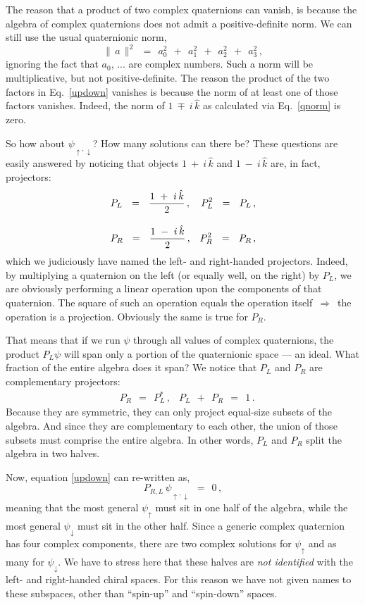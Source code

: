 \documentclass[epsfig,12pt]{article}
\newcommand{\kk}{\hat k}
\begin{document}
	The reason that a product of two complex quaternions can vanish, is because
	the algebra of complex quaternions does not admit a positive-definite norm.
	We can still use the usual quaternionic norm,
\begin{equation}
\label{qnorm}
	\|\,a\,\|^2	~~=~~	a_0^2  ~~+~~  a_1^2  ~~+~~  a_2^2  ~~+~~  a_3^2\,,
\end{equation}
	ignoring the fact that $ a_0 $, ... are complex numbers.
	Such a norm will be multiplicative, but not positive-definite.
	The reason the product of the two factors in Eq.~\eqref{updown} vanishes 
	is because the norm of at least one of those factors vanishes.
	Indeed, the norm of $ 1 ~\mp~ i\,\kk $ as calculated via Eq.~\eqref{qnorm} is zero.

	So how about $ \psi_{\uparrow,\downarrow} $? How many solutions can there be?
	These questions are easily answered by noticing that objects $ 1 ~+~ i\,\kk $ 
	and $ 1 ~-~ i\,\kk $ are, in fact, projectors:
\begin{align}
%
	\notag
	&
	P_L	~~=~~	\frac { 1 ~+~ i\,\kk } 2\,,
	&
	P_L^2	~~=~~	P_L\,,
	\\[3mm]
%	
	&
	P_R	~~=~~	\frac { 1 ~-~ i\,\kk } 2\,,
	&
	P_R^2	~~=~~	P_R\,,
\end{align}
	which we judiciously have named the left- and right-handed projectors.
	Indeed, by multiplying a quaternion on the left (or equally well, on the right) by $ P_L $,
	we are obviously performing a linear operation upon the components of that quaternion.
	The square of such an operation equals the operation itself $ \,\Rightarrow\, $
	the operation is a projection.
	Obviously the same is true for $ P_R $.

	That means that if we run $ \psi $ through all values of complex quaternions,
	the product $ P_L \psi $ will span only a portion of the quaternionic space
	--- an ideal.
	What fraction of the entire algebra does it span?
	We notice that $ P_L $ and $ P_R $ are complementary projectors:
\begin{align}
	&
	P_R	~~=~~	P_L^*\,,
	&
	P_L  ~~+~~  P_R		~~=~~	1\,.
\end{align}
	Because they are symmetric, they can only project equal-size subsets of the algebra.
	And since they are complementary to each other, the union of those subsets
	must comprise the entire algebra.
	In other words, $ P_L $ and $ P_R $ split the algebra in two halves.

	Now, equation \eqref{updown} can re-written as,
\begin{equation}
\label{PRL}
	P_{R,L}\, \psi_{\uparrow,\downarrow}		~~=~~		0\,,
\end{equation}
	meaning that the most general $ \psi_\uparrow $ must sit in one half of the algebra,
	while the most general $ \psi_\downarrow $ must sit in the other half.
	Since a generic complex quaternion has four complex components,
	there are two complex solutions for $ \psi_\uparrow $ and as many for $ \psi_\downarrow $.
	We have to stress here that these halves are \emph{not identified} with the left-
	and right-handed chiral spaces.
	For this reason we have not given names to these subspaces, other than ``spin-up'' and
	``spin-down'' spaces.
\end{document}
